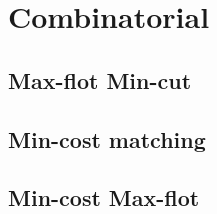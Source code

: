 \newpage
\section{Combinatorial}

\subsection{Max-flot Min-cut}


\subsection{Min-cost matching}


\subsection{Min-cost Max-flot}